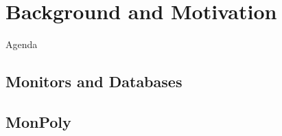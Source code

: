 \section{Background and Motivation}


\begin{frame}{Agenda}
    \tableofcontents
\end{frame}

\subsection{Monitors and Databases}


\subsection{MonPoly}

